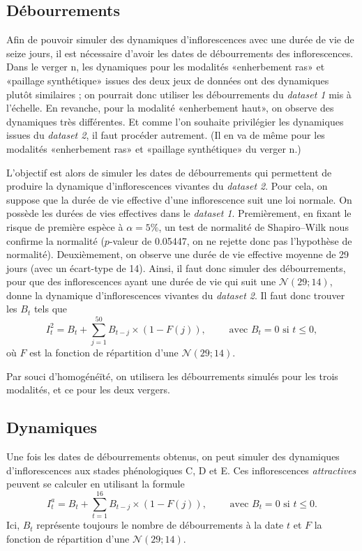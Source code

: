 \subsection{Débourrements}

 Afin de pouvoir simuler des dynamiques d'inflorescences avec une durée de vie de seize jours, il est nécessaire d'avoir les dates de débourrements des inflorescences.
 Dans le verger n, les dynamiques pour les modalités «enherbement ras» et «paillage synthétique» issues des deux jeux de données ont des dynamiques plutôt similaires ; on pourrait donc utiliser les débourrements du \emph{dataset 1} mis à l'échelle.
 En revanche, pour la modalité «enherbement haut», on observe des dynamiques très différentes. 
 Et comme l'on souhaite privilégier les dynamiques issues du \emph{dataset 2}, il faut procéder autrement.
 (Il en va de même pour les modalités «enherbement ras» et «paillage synthétique» du verger n.)
 
 L'objectif est alors de simuler les dates de débourrements qui permettent de produire la dynamique d'inflorescences vivantes du \emph{dataset 2}.
 Pour cela, on suppose que la durée de vie effective d'une inflorescence suit une loi normale.
 On possède les durées de vies effectives dans le \emph{dataset 1}.
 Premièrement, en fixant le risque de première espèce à $\alpha = 5\%$, un test de normalité de Shapiro--Wilk nous confirme la normalité ($p$-valeur de 0.05447, on ne rejette donc pas l'hypothèse de normalité).
 Deuxièmement, on observe une durée de vie effective moyenne de 29 jours (avec un écart-type de 14).
 Ainsi, il faut donc simuler des débourrements, pour que des inflorescences ayant une durée de vie qui suit une $\mathcal{N}\left( 29; 14 \right)$, donne la dynamique d'inflorescences vivantes du \emph{dataset 2}.
 Il faut donc trouver les $B_t$ tels que 
 \[
 I_{t}^{2} = B_t + \sum_{j = 1}^{50} B_{t - j} \times \left( 1 - F\left( j \right) \right),  \qquad \text{ avec } B_{t} = 0 \text{ si } t \leq 0,
 \]
 où $F$ est la fonction de répartition d'une $\mathcal{N}\left( 29;14 \right)$.
 
 Par souci d'homogénéïté, on utilisera les débourrements simulés pour les trois modalités, et ce pour les deux vergers.
 
 
\subsection{Dynamiques}


Une fois les dates de débourrements obtenus, on peut simuler des dynamiques d'inflorescences aux stades phénologiques C, D et E.
Ces inflorescences \emph{attractives} peuvent se calculer en utilisant la formule
\[
I_{t}^{a} = B_t + \sum_{t = 1}^{16} B_{t-j} \times \left( 1 - F(j) \right), \qquad \text{ avec } B_{t} = 0 \text{ si } t \leq 0. 
\]
Ici, $B_t$ représente toujours le nombre de débourrements à la date $t$ et $F$ la fonction de répartition d'une $\mathcal{N}\left( 29; 14 \right)$.
